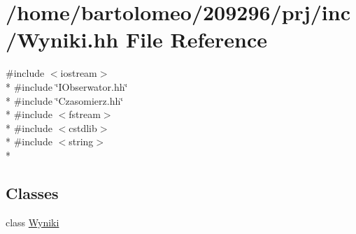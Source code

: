 \hypertarget{_wyniki_8hh}{\section{/home/bartolomeo/209296/prj/inc/\-Wyniki.hh File Reference}
\label{_wyniki_8hh}
}
{\ttfamily \#include $<$iostream$>$}\\*
{\ttfamily \#include \char`\"{}I\-Obserwator.\-hh\char`\"{}}\\*
{\ttfamily \#include \char`\"{}Czasomierz.\-hh\char`\"{}}\\*
{\ttfamily \#include $<$fstream$>$}\\*
{\ttfamily \#include $<$cstdlib$>$}\\*
{\ttfamily \#include $<$string$>$}\\*
\subsection*{Classes}
\begin{DoxyCompactItemize}
\item 
class \hyperlink{class_wyniki}{Wyniki}
\end{DoxyCompactItemize}
